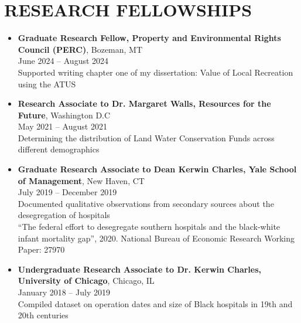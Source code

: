 \documentclass[11pt]{article}
\begin{document}
\section*{RESEARCH FELLOWSHIPS}
\begin{itemize}[left=0pt]
    \item \textbf{Graduate Research Fellow, Property and Environmental Rights Council (PERC)}, Bozeman, MT \\
    June 2024 -- August 2024 \\
    Supported writing chapter one of my dissertation: Value of Local Recreation using the ATUS
    \item \textbf{Research Associate to Dr. Margaret Walls, Resources for the Future}, Washington D.C \\
    May 2021 -- August 2021 \\
    Determining the distribution of Land Water Conservation Funds across different demographics
    \item \textbf{Graduate Research Associate to Dean Kerwin Charles, Yale School of Management}, New Haven, CT \\
    July 2019 -- December 2019 \\
    Documented qualitative observations from secondary sources about the desegregation of hospitals \\
    “The federal effort to desegregate southern hospitals and the black-white infant mortality gap”, 2020. National Bureau of Economic Research Working Paper: 27970
    \item \textbf{Undergraduate Research Associate to Dr. Kerwin Charles, University of Chicago}, Chicago, IL \\
    January 2018 -- July 2019 \\
    Compiled dataset on operation dates and size of Black hospitals in 19th and 20th centuries
\end{itemize}
\end{document}
